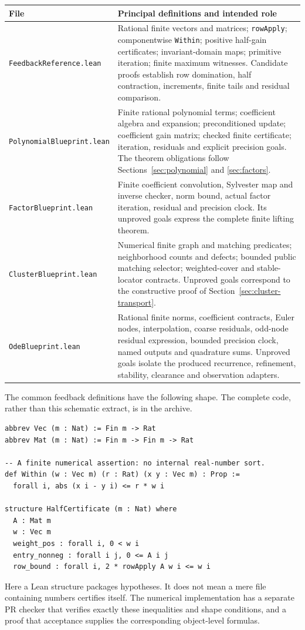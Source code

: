 \begin{longtable}{>{\raggedright\arraybackslash}p{}>{\raggedright\arraybackslash}p{}}
\toprule File & Principal definitions and intended role\\\midrule\endhead
\nolinkurl{FeedbackReference.lean} & Rational finite vectors and matrices; \texttt{rowApply}; componentwise \texttt{Within}; positive half-gain certificates; invariant-domain maps; primitive iteration; finite maximum witnesses. Candidate proofs establish row domination, half contraction, increments, finite tails and residual comparison.\\
\nolinkurl{PolynomialBlueprint.lean} & Finite rational polynomial terms; coefficient algebra and expansion; preconditioned update; coefficient gain matrix; checked finite certificate; iteration, residuals and explicit precision goals. The theorem obligations follow Sections~\ref{sec:polynomial} and \ref{sec:factors}.\\
\nolinkurl{FactorBlueprint.lean} & Finite coefficient convolution, Sylvester map and inverse checker, norm bound, actual factor iteration, residual and precision clock. Its unproved goals express the complete finite lifting theorem.\\
\nolinkurl{ClusterBlueprint.lean} & Numerical finite graph and matching predicates; neighborhood counts and defects; bounded public matching selector; weighted-cover and stable-locator contracts. Unproved goals correspond to the constructive proof of Section~\ref{sec:cluster-transport}.\\
\nolinkurl{OdeBlueprint.lean} & Rational finite norms, coefficient contracts, Euler nodes, interpolation, coarse residuals, odd-node residual expression, bounded precision clock, named outputs and quadrature sums. Unproved goals isolate the produced recurrence, refinement, stability, clearance and observation adapters.\\
\bottomrule
\end{longtable}

The common feedback definitions have the following shape. The complete code, rather than this schematic extract, is in the archive.
\begin{lstlisting}
abbrev Vec (m : Nat) := Fin m -> Rat
abbrev Mat (m : Nat) := Fin m -> Fin m -> Rat

-- A finite numerical assertion: no internal real-number sort.
def Within (w : Vec m) (r : Rat) (x y : Vec m) : Prop :=
  forall i, abs (x i - y i) <= r * w i

structure HalfCertificate (m : Nat) where
  A : Mat m
  w : Vec m
  weight_pos : forall i, 0 < w i
  entry_nonneg : forall i j, 0 <= A i j
  row_bound : forall i, 2 * rowApply A w i <= w i
\end{lstlisting}
Here a Lean structure packages hypotheses. It does not mean a mere file containing numbers certifies itself. The numerical implementation has a separate PR checker that verifies exactly these inequalities and shape conditions, and a proof that acceptance supplies the corresponding object-level formulas.

